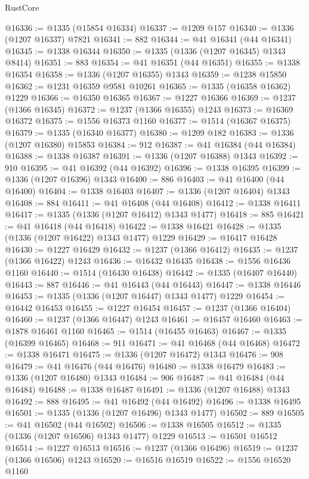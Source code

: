 \begin{lexlean}{RustCore}
\begin{coremodule}
@16336 := @1335 (@15854 @16334)
@16337 := @1209 @157
@16340 := @1336 (@1207 @16337) @7821
@16341 := 882
@16344 := @41 @16341 (@44 @16341)
@16345 := @1338 @16344
@16350 := @1335 (@1336 (@1207 @16345) @1343 @8414)
@16351 := 883
@16354 := @41 @16351 (@44 @16351)
@16355 := @1338 @16354
@16358 := @1336 (@1207 @16355) @1343
@16359 := @1238 @15850
@16362 := @1231 @16359 @9581 @10261
@16365 := @1335 (@16358 @16362) @1229
@16366 := @16350 @16365
@16367 := @1227 @16366
@16369 := @1237 (@1366 @16345)
@16372 := @1237 (@1366 @16355) @1243
@16373 := @16369 @16372
@16375 := @1556 @16373 @1160
@16377 := @1514 (@16367 @16375)
@16379 := @1335 (@16340 @16377)
@16380 := @1209 @182
@16383 := @1336 (@1207 @16380) @15853
@16384 := 912
@16387 := @41 @16384 (@44 @16384)
@16388 := @1338 @16387
@16391 := @1336 (@1207 @16388) @1343
@16392 := 910
@16395 := @41 @16392 (@44 @16392)
@16396 := @1338 @16395
@16399 := @1336 (@1207 @16396) @1343
@16400 := 886
@16403 := @41 @16400 (@44 @16400)
@16404 := @1338 @16403
@16407 := @1336 (@1207 @16404) @1343
@16408 := 884
@16411 := @41 @16408 (@44 @16408)
@16412 := @1338 @16411
@16417 := @1335 (@1336 (@1207 @16412) @1343 @1477)
@16418 := 885
@16421 := @41 @16418 (@44 @16418)
@16422 := @1338 @16421
@16428 := @1335 (@1336 (@1207 @16422) @1343 @1477) @1229
@16429 := @16417 @16428
@16430 := @1227 @16429
@16432 := @1237 (@1366 @16412)
@16435 := @1237 (@1366 @16422) @1243
@16436 := @16432 @16435
@16438 := @1556 @16436 @1160
@16440 := @1514 (@16430 @16438)
@16442 := @1335 (@16407 @16440)
@16443 := 887
@16446 := @41 @16443 (@44 @16443)
@16447 := @1338 @16446
@16453 := @1335 (@1336 (@1207 @16447) @1343 @1477) @1229
@16454 := @16442 @16453
@16455 := @1227 @16454
@16457 := @1237 (@1366 @16404)
@16460 := @1237 (@1366 @16447) @1243
@16461 := @16457 @16460
@16463 := @1878 @16461 @1160
@16465 := @1514 (@16455 @16463)
@16467 := @1335 (@16399 @16465)
@16468 := 911
@16471 := @41 @16468 (@44 @16468)
@16472 := @1338 @16471
@16475 := @1336 (@1207 @16472) @1343
@16476 := 908
@16479 := @41 @16476 (@44 @16476)
@16480 := @1338 @16479
@16483 := @1336 (@1207 @16480) @1343
@16484 := 906
@16487 := @41 @16484 (@44 @16484)
@16488 := @1338 @16487
@16491 := @1336 (@1207 @16488) @1343
@16492 := 888
@16495 := @41 @16492 (@44 @16492)
@16496 := @1338 @16495
@16501 := @1335 (@1336 (@1207 @16496) @1343 @1477)
@16502 := 889
@16505 := @41 @16502 (@44 @16502)
@16506 := @1338 @16505
@16512 := @1335 (@1336 (@1207 @16506) @1343 @1477) @1229
@16513 := @16501 @16512
@16514 := @1227 @16513
@16516 := @1237 (@1366 @16496)
@16519 := @1237 (@1366 @16506) @1243
@16520 := @16516 @16519
@16522 := @1556 @16520 @1160

\end{coremodule}
\end{lexlean}
